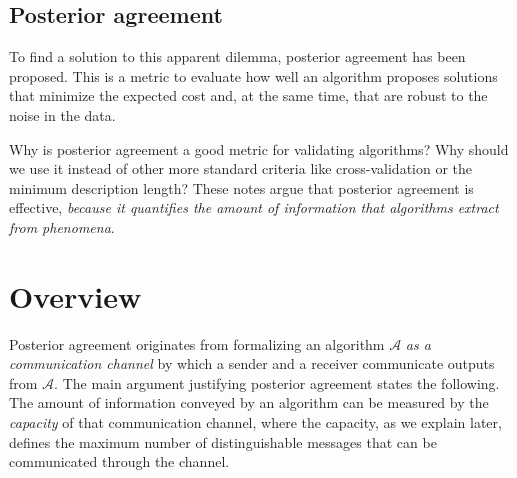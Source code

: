 
\subsection*{Posterior agreement}

To find a solution to this apparent dilemma, posterior agreement has been proposed. This is a metric to evaluate how well an algorithm proposes solutions that minimize the expected cost and, at the same time, that are robust to the noise in the data.

Why is posterior agreement a good metric for validating algorithms? Why should we use it instead of other more standard criteria like cross-validation or the minimum description length? These notes argue that posterior agreement is effective, \emph{because it quantifies the amount of information that algorithms extract from phenomena}.

\section{Overview}
%

Posterior agreement originates from formalizing an algorithm $\mathcal{A}$ \emph{as a communication channel} by which a sender and a receiver communicate outputs from $\mathcal{A}$. The main argument justifying posterior agreement states the following. The amount of information conveyed by an algorithm can be measured by the \emph{capacity} of that communication channel, where the capacity, as we explain later, defines the maximum number of distinguishable messages that can be communicated through the channel.

